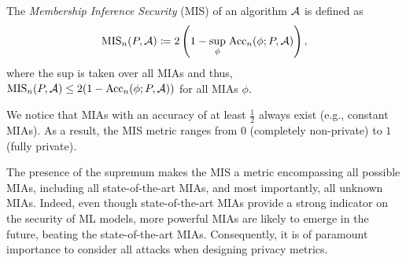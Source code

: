 


\begin{definition}[MIS] 
The \textit{Membership Inference Security} (MIS) of an algorithm ${\mathcal{A}}$ is defined as 
\begin{equation}
\label{def:sec}
{\text{MIS}}_n(P, {\mathcal{A}})\coloneqq 2\left(1-\underset{\phi}{\sup}\;{\text{Acc}}_n(\phi; P,{\mathcal{A}} )\right), 
\end{equation}
where the sup is taken over all MIAs and thus, ${\text{MIS}}_n(P, {\mathcal{A}})\leq 2(1-{\text{Acc}}_n(\phi; P,{\mathcal{A}} ))$ for all MIAs $\phi$.
\end{definition}
We notice that MIAs with an accuracy of at least \( \frac{1}{2} \) always exist (e.g., constant MIAs). As a result, the MIS metric ranges from \( 0 \) (completely non-private) to \( 1 \) (fully private).

\begin{remark}
The presence of the supremum makes the MIS a metric encompassing all possible MIAs, including all state-of-the-art MIAs, and most importantly, all unknown MIAs. Indeed, even though state-of-the-art MIAs provide a strong indicator on the security of ML models, more powerful MIAs are likely to emerge in the future, beating the state-of-the-art MIAs. Consequently, it is of paramount importance to consider all attacks when designing privacy metrics. 
\end{remark}